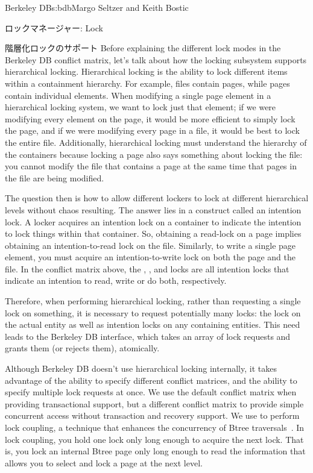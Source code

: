\begin{aosachapter}{Berkeley DB}{s:bdb}{Margo Seltzer and Keith Bostic}
\begin{aosasect1}{ロックマネージャー: Lock}
\begin{aosasect2}{階層化ロックのサポート}
Before explaining the different lock modes in the Berkeley DB conflict
matrix, let's talk about how the locking subsystem supports
hierarchical locking. Hierarchical locking is the ability to lock
different items within a containment hierarchy. For example, files
contain pages, while pages contain individual elements. When modifying
a single page element in a hierarchical locking system, we want to
lock just that element; if we were modifying every element on the
page, it would be more efficient to simply lock the page, and if we
were modifying every page in a file, it would be best to lock the
entire file. Additionally, hierarchical locking must understand the
hierarchy of the containers because locking a page also says something
about locking the file: you cannot modify the file that contains a
page at the same time that pages in the file are being modified.

The question then is how to allow different lockers to lock at
different hierarchical levels without chaos resulting.  The answer
lies in a construct called an intention lock. A locker acquires an
intention lock on a container to indicate the intention to lock things
within that container. So, obtaining a read-lock on a page implies
obtaining an intention-to-read lock on the file. Similarly, to write a
single page element, you must acquire an intention-to-write lock on
both the page and the file. In the conflict matrix above, the ,
, and  locks are all intention locks that indicate an
intention to read, write or do both, respectively.

Therefore, when performing hierarchical locking, rather than
requesting a single lock on something, it is necessary to request
potentially many locks: the lock on the actual entity as well as
intention locks on any containing entities. This need leads to the
Berkeley DB  interface, which
takes an array of lock requests and grants them (or rejects them),
atomically.

Although Berkeley DB doesn't use hierarchical locking internally, it
takes advantage of the ability to specify different conflict
matrices, and the ability to specify multiple lock requests at once.
We use the default conflict matrix when providing transactional
support, but a different conflict matrix to provide simple concurrent
access without transaction and recovery support.  We use 
 to perform lock
coupling, a technique that enhances the concurrency of Btree
traversals~\cite{bib:comer:btree}.  In lock coupling, you hold
one lock only long enough to acquire the next lock.  That is, you lock
an internal Btree page only long enough to read the information that
allows you to select and lock a page at the next level.


\end{aosasect2}
\end{aosasect1}
\end{aosachapter}
